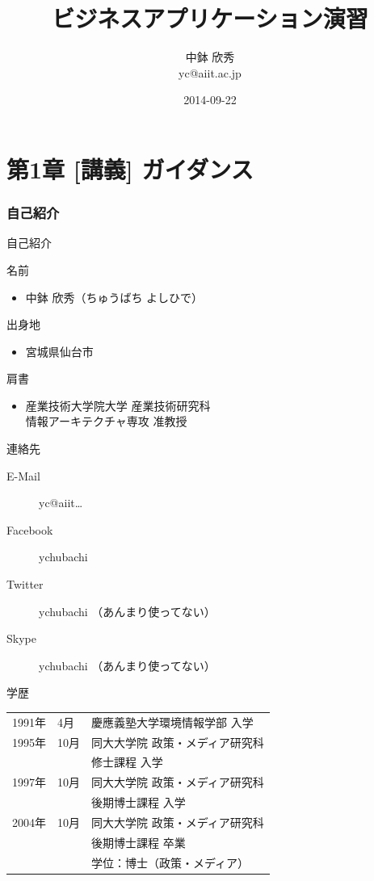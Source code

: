 \documentclass[t, aspectratio=169]{beamer}
\date{\insertpart}
\institute[AIIT]{産業技術大学院大学(AIIT)}
\author{中鉢 欣秀 \\ yc@aiit.ac.jp}
\date{2014-09-22}
\title{ビジネスアプリケーション演習}
\begin{document}
\maketitle

\part{第1章 [講義] ガイダンス}
\label{sec-1}
\section{自己紹介}
\label{sec-1-1}
\begin{frame}[label=sec-1-1-1]{自己紹介}
\begin{block}{名前}
\begin{itemize}
\item 中鉢 欣秀（ちゅうばち よしひで）
\end{itemize}
\end{block}
\begin{block}{出身地}
\begin{itemize}
\item 宮城県仙台市
\end{itemize}
\end{block}
\begin{block}{肩書}
\begin{itemize}
\item 産業技術大学院大学 産業技術研究科 \\ 情報アーキテクチャ専攻 准教授
\end{itemize}
\end{block}
\end{frame}
\begin{frame}[label=sec-1-1-2]{連絡先}
\begin{description}
\item[{E-Mail}] yc@aiit\ldots{}
\item[{Facebook}] ychubachi
\item[{Twitter}] ychubachi （あんまり使ってない）
\item[{Skype}] ychubachi （あんまり使ってない）
\end{description}
\end{frame}
\begin{frame}[label=sec-1-1-3]{学歴}
\begin{center}
\begin{tabular}{lll}
1991年 & 4月 & 慶應義塾大学環境情報学部 入学\\
1995年 & \alert{10月} & 同大大学院 政策・メディア研究科\\
 &  & 修士課程 入学\\
1997年 & 10月 & 同大大学院 政策・メディア研究科\\
 &  & 後期博士課程 入学\\
2004年 & 10月 & 同大大学院 政策・メディア研究科\\
 &  & 後期博士課程 卒業\\
 &  & 学位：博士（政策・メディア）\\
\end{tabular}
\end{center}
\end{frame}
\end{document}
